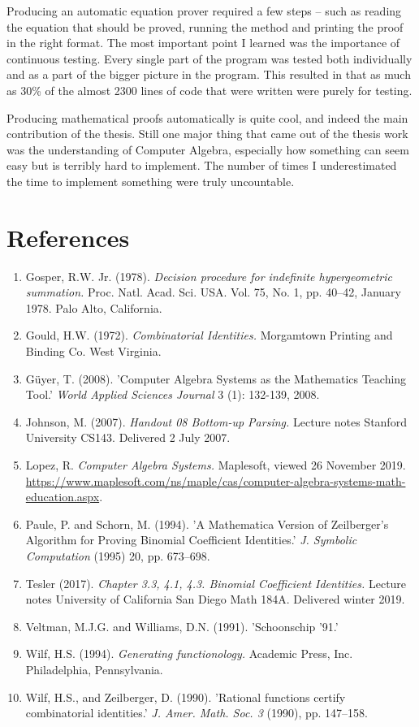 \documentclass[letterpaper]{article}
\begin{document}
Producing an automatic equation prover required a few steps -- such as reading the equation that should be proved, running the method and printing the proof in the right format. The most important point I learned was the importance of continuous testing. Every single part of the program was tested both individually and as a part of the bigger picture in the program. This resulted in that as much as 30\% of the almost 2300 lines of code that were written were purely for testing.

Producing mathematical proofs automatically is quite cool, and indeed the main contribution of the thesis. Still one major thing that came out of the thesis work was the understanding of Computer Algebra, especially how something can seem easy but is terribly hard to implement. The number of times I underestimated the time to implement something were truly uncountable.

\footnotesize
\section{References}
\begin{enumerate}
  \setlength{\itemsep}{-1.8pt}
  \item Gosper, R.W. Jr. (1978). \textit{Decision procedure for indefinite hypergeometric summation.} Proc. Natl. Acad. Sci. USA. Vol. 75, No. 1, pp. 40--42, January 1978. Palo Alto, California.
  \item Gould, H.W. (1972). \textit{Combinatorial Identities.} Morgamtown Printing and Binding Co. West Virginia.
  \item Güyer, T. (2008). 'Computer Algebra Systems as the Mathematics Teaching Tool.' \textit{World Applied Sciences Journal} 3 (1): 132-139, 2008.
  \item Johnson, M. (2007). \textit{Handout 08 Bottom-up Parsing.} Lecture notes Stanford University CS143. Delivered 2 July 2007.
  \item Lopez, R. \textit{Computer Algebra Systems.} Maplesoft, viewed 26 November 2019. \url{https://www.maplesoft.com/ns/maple/cas/computer-algebra-systems-math-education.aspx}.
  \item Paule, P. and Schorn, M. (1994). 'A Mathematica Version of Zeilberger's Algorithm for Proving Binomial Coefficient Identities.' \textit{J. Symbolic Computation} (1995) 20, pp. 673--698.
  \item Tesler (2017). \textit{Chapter 3.3, 4.1, 4.3. Binomial Coefficient Identities.} Lecture notes University of California San Diego Math 184A. Delivered winter 2019.
  \item Veltman, M.J.G. and Williams, D.N. (1991). 'Schoonschip ’91.'
  \item Wilf, H.S. (1994). \textit{Generating functionology.} Academic Press, Inc. Philadelphia, Pennsylvania.
  \item Wilf, H.S., and Zeilberger, D. (1990). 'Rational functions certify combinatorial identities.' \textit{J. Amer. Math. Soc. 3} (1990), pp. 147–158.
\end{enumerate}
\end{document}
